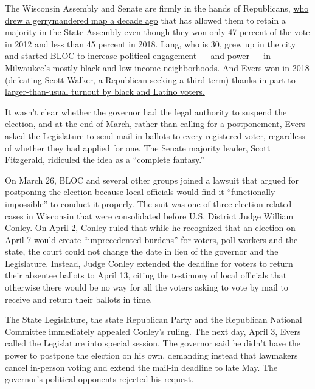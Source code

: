 The Wisconsin Assembly and Senate are firmly in the hands of
Republicans,
\href{https://www.nytimes3xbfgragh.onion/2017/08/29/magazine/the-new-front-in-the-gerrymandering-wars-democracy-vs-math.html}{who
drew a gerrymandered map a decade ago} that has allowed them to retain a
majority in the State Assembly even though they won only 47 percent of
the vote in 2012 and less than 45 percent in 2018. Lang, who is 30, grew
up in the city and started BLOC to increase political engagement --- and
power --- in Milwaukee's mostly black and low-income neighborhoods. And
Evers won in 2018 (defeating Scott Walker, a Republican seeking a third
term)
\href{https://www.theatlantic.com/politics/archive/2018/11/black-and-latino-turnout-helped-defeat-scott-walker/575818/}{thanks
in part to larger-than-usual turnout by black and Latino voters.}

It wasn't clear whether the governor had the legal authority to suspend
the election, and at the end of March, rather than calling for a
postponement, Evers asked the Legislature to send
\href{https://www.nytimes3xbfgragh.onion/2020/06/10/us/politics/voting-by-mail-georgia.html}{mail-in
ballots} to every registered voter, regardless of whether they had
applied for one. The Senate majority leader, Scott Fitzgerald, ridiculed
the idea as a ``complete fantasy.''

On March 26, BLOC and several other groups joined a lawsuit that argued
for postponing the election because local officials would find it
``functionally impossible'' to conduct it properly. The suit was one of
three election-related cases in Wisconsin that were consolidated before
U.S. District Judge William Conley. On April 2,
\href{https://madison.com/wsj/news/local/govt-and-politics/ill-advised-election-to-go-on-amid-covid-19-pandemic-judge-says-but-some-absentee/article_8dd80672-af4b-5bc6-b25b-f29b92a78382.html}{Conley
ruled} that while he recognized that an election on April 7 would create
``unprecedented burdens'' for voters, poll workers and the state, the
court could not change the date in lieu of the governor and the
Legislature. Instead, Judge Conley extended the deadline for voters to
return their absentee ballots to April 13, citing the testimony of local
officials that otherwise there would be no way for all the voters asking
to vote by mail to receive and return their ballots in time.

The State Legislature, the state Republican Party and the Republican
National Committee immediately appealed Conley's ruling. The next day,
April 3, Evers called the Legislature into special session. The governor
said he didn't have the power to postpone the election on his own,
demanding instead that lawmakers cancel in-person voting and extend the
mail-in deadline to late May. The governor's political opponents
rejected his request.

